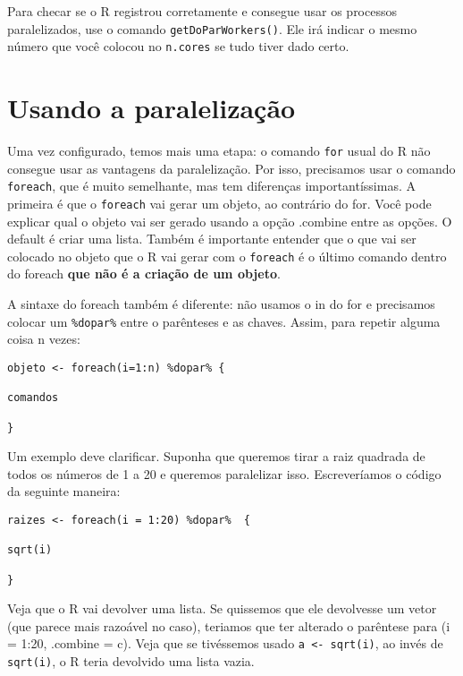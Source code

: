 \documentclass[
]{book}
\begin{document}
Para checar se o R registrou corretamente e consegue usar os processos paralelizados, use o comando \texttt{getDoParWorkers()}. Ele irá indicar o mesmo número que você colocou no \texttt{n.cores} se tudo tiver dado certo.

\hypertarget{usando-a-paralelizauxe7uxe3o}{%
\section{Usando a paralelização}\label{usando-a-paralelizauxe7uxe3o}}

Uma vez configurado, temos mais uma etapa: o comando \texttt{for} usual do R não consegue usar as vantagens da paralelização. Por isso, precisamos usar o comando \texttt{foreach}, que é muito semelhante, mas tem diferenças importantíssimas. A primeira é que o \texttt{foreach} vai gerar um objeto, ao contrário do for. Você pode explicar qual o objeto vai ser gerado usando a opção .combine entre as opções. O default é criar uma lista. Também é importante entender que o que vai ser colocado no objeto que o R vai gerar com o \texttt{foreach} é o último comando dentro do foreach \textbf{que não é a criação de um objeto}.

A sintaxe do foreach também é diferente: não usamos o in do for e precisamos colocar um \texttt{\%dopar\%} entre o parênteses e as chaves. Assim, para repetir alguma coisa n vezes:

\begin{verbatim}
objeto <- foreach(i=1:n) %dopar% {

comandos

}
\end{verbatim}

Um exemplo deve clarificar. Suponha que queremos tirar a raiz quadrada de todos os números de 1 a 20 e queremos paralelizar isso. Escreveríamos o código da seguinte maneira:

\begin{verbatim}
raizes <- foreach(i = 1:20) %dopar%  {

sqrt(i)

}
\end{verbatim}

Veja que o R vai devolver uma lista. Se quissemos que ele devolvesse um vetor (que parece mais razoável no caso), teriamos que ter alterado o parêntese para (i = 1:20, .combine = c). Veja que se tivéssemos usado \texttt{a\ \textless{}-\ sqrt(i)}, ao invés de \texttt{sqrt(i)}, o R teria devolvido uma lista vazia.
\end{document}
